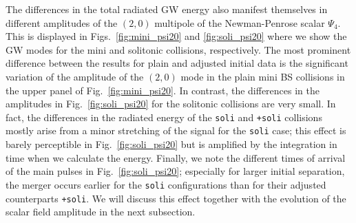 \documentclass[]{iopart}
\newcommand{\us}[1]{\textcolor{teal}{[{\it\textbf{US: #1}}]} }
\renewcommand{\mr}[1]{\textcolor{purple}{[{\it\textbf{MR: #1}}]} }
\begin{document}
The differences in the total radiated GW energy also manifest themselves
in different amplitudes of the $(2,0)$ multipole of the Newman-Penrose
scalar $\Psi_4$. This is displayed in Figs.~\ref{fig:mini_psi20}
and \ref{fig:soli_psi20} where we show the GW modes for the mini and
solitonic collisions, respectively. The most prominent difference
between the results for plain and adjusted initial data is the
significant variation of the amplitude of the $(2,0)$ mode in the
plain mini BS collisions in the upper panel of Fig.~\ref{fig:mini_psi20}.
In contrast, the differences in the amplitudes in Fig.~\ref{fig:soli_psi20}
for the solitonic collisions are very small. In fact, the differences
in the radiated energy of the {\tt soli} and {\tt +soli} collisions mostly
arise from a minor stretching of the signal for the {\tt soli} case; this
effect is barely perceptible in Fig.~\ref{fig:soli_psi20} but is amplified
by the integration in time when we calculate the energy. Finally, we note
the different times of arrival of the main pulses in Fig.~\ref{fig:soli_psi20};
especially for larger initial separation, the merger occurs earlier for
the {\tt soli} configurations than for their adjusted counterparts
{\tt +soli}.
We will discuss this effect together with the evolution
of the scalar field amplitude in the next subsection.
\end{document}

